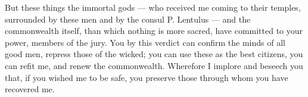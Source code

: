  But these things the immortal gods --- who received me coming to their temples, surrounded by these men and by the consul P. Lentulus --- and the commonwealth itself, than which nothing is more sacred, have committed to your power, members of the jury. You by this verdict can confirm the minds of all good men, repress those of the wicked; you can use these as the best citizens, you can refit me, and renew the commonwealth. Wherefore I implore and beseech you that, if you wished me to be safe, you preserve those through whom you have recovered me.
